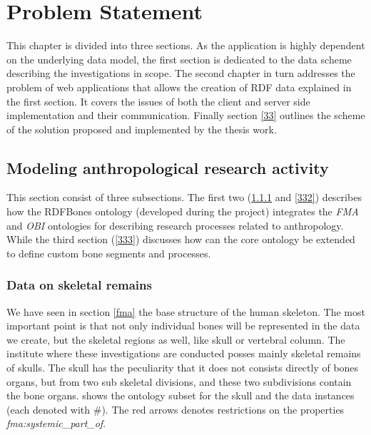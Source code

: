 \chapter{Problem Statement}


This chapter is divided into three sections. As the application is highly dependent on the underlying data model, the first section is dedicated to the data scheme describing the investigations in scope. The second chapter in turn addresses the problem of web applications that allows the creation of RDF data explained in the first section. It covers the issues of both the client and server side implementation and their communication. Finally section \ref{33} outlines the scheme of the solution proposed and implemented by the thesis work.


\section{Modeling anthropological research activity} \label{ps1}


This section consist of three subsections. The first two (\ref{331} and \ref{332}) describes how the RDFBones ontology (developed during the project) integrates the \textit{FMA} and \textit{OBI} ontologies for describing research processes related to anthropology. While the third section (\ref{333}) discusses how can the core ontology be extended to define custom bone segments and processes.


\subsection{Data on skeletal remains} \label{331}


We have seen in section \ref{fma} the base structure of the human skeleton. The most important point is that not only individual bones will be represented in the data we create, but the skeletal regions as well, like skull or vertebral column. The institute where these investigations are conducted posses mainly  skeletal remains of skulls. The skull has the peculiarity that it does not consists directly of bones organs, but from two sub skeletal divisions, and these two subdivisions contain the bone organs.  shows the ontology subset for the skull and the data instances (each denoted with \#). The red arrows denotes restrictions on the properties \textit{fma:systemic\_part\_of}.  


